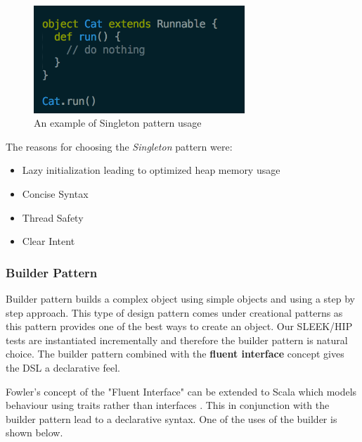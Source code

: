 \begin{figure}[H]
  \centering
    \includegraphics[width=300px]{figures/singleton2.png}
  \caption{An example of Singleton pattern usage}
\end{figure}

\noindent
The reasons for choosing the \textit{Singleton} pattern were:
\begin{itemize}
\item Lazy initialization leading to optimized heap memory usage
\item Concise Syntax
\item Thread Safety
\item Clear Intent
\end{itemize}

\subsubsection{Builder Pattern}
Builder pattern builds a complex object using simple objects and using a step by step approach. This type of design pattern comes under creational patterns as this pattern provides one of the best ways to create an object. Our SLEEK/HIP tests are instantiated incrementally and therefore the builder pattern is natural choice. The builder pattern combined with the \textbf{fluent interface} concept gives the DSL a declarative feel.
\bigskip

\noindent
Fowler's concept of the "Fluent Interface" can be extended to Scala which models behaviour using traits rather than interfaces \cite{scala}. This in conjunction with the builder pattern lead to a declarative syntax. One of the uses of the builder is shown below.

